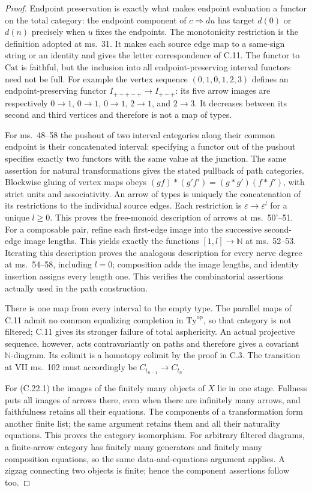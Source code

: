 \begin{proof}
Endpoint preservation is exactly what makes endpoint evaluation a
functor on the total category: the endpoint component of
$c\Rightarrow d u$ has target $d(0)$ or $d(n)$ precisely when $u$
fixes the endpoints. The monotonicity restriction is the definition
adopted at ms.~31. It makes each source edge map to a same-sign
string or an identity and gives the letter correspondence of C.11.
The functor to $\mathrm{Cat}$ is faithful, but the inclusion into
all endpoint-preserving interval functors need not be full. For
example the vertex sequence $(0,1,0,1,2,3)$ defines an
endpoint-preserving functor $I_{+-+-+}\to I_{+-+}$: its five
arrow images are respectively $0\to1$, $0\to1$, $0\to1$,
$2\to1$, and $2\to3$. It decreases between its second and
third vertices and therefore is not a map of types.

For ms.~48--58 the pushout of two interval categories along their
common endpoint is their concatenated interval: specifying a
functor out of the pushout specifies exactly two functors with
the same value at the junction. The same assertion for natural
transformations gives the stated pullback of path categories.
Blockwise gluing of vertex maps obeys
$(gf)*(g'f')=(g*g')(f*f')$, with strict units and associativity.
An arrow of types is uniquely the concatenation of its restrictions
to the individual source edges. Each restriction is
$\varepsilon\to\varepsilon^{l}$ for a unique $l\geq0$.
This proves the free-monoid description of arrows at ms.~50'--51.
For a composable pair, refine each first-edge image into the
successive second-edge image lengths. This yields exactly the
functions $[1,l]\to\mathbb N$ at ms.~52--53. Iterating this
description proves the analogous description for every nerve
degree at ms.~54--58, including $l=0$; composition adds the image
lengths, and identity insertion assigns every length one. This
verifies the combinatorial assertions actually used in the path
construction.

There is one map from every interval to the empty type. The
parallel maps of C.11 admit no common equalizing completion in
$\mathrm{Ty}^{\mathrm{op}}$, so that category is not filtered;
C.11 gives its stronger failure of total asphericity. An actual
projective sequence, however, acts contravariantly on paths and
therefore gives a covariant $\mathbb N$-diagram. Its colimit is a
homotopy colimit by the proof in C.3. The transition at VII
ms.~102 must accordingly be $C_{t_{n-1}}\to C_{t_n}$.

For (C.22.1) the images of the finitely many objects of $X$ lie in
one stage. Fullness puts all images of arrows there, even when
there are infinitely many arrows, and faithfulness retains all
their equations. The components of a transformation form another
finite list; the same argument retains them and all their
naturality equations. This proves the category isomorphism. For
arbitrary filtered diagrams, a finite-arrow category has finitely
many generators and finitely many composition equations, so the
same data-and-equations argument applies. A zigzag connecting two
objects is finite; hence the component assertions follow too.
\end{proof}

